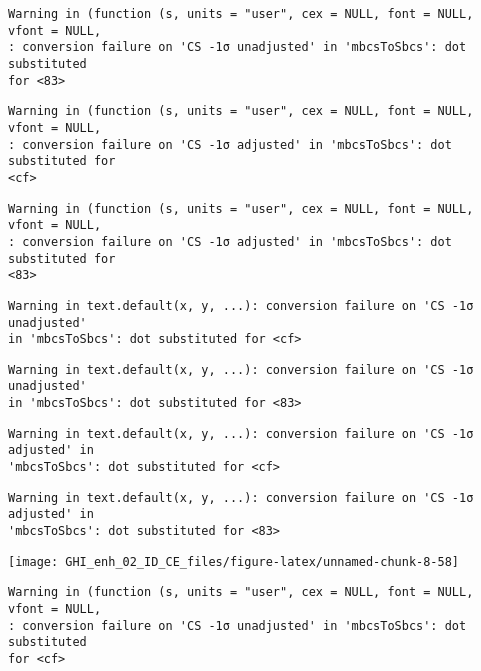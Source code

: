 \documentclass[
  10pt,
  a4paper,oneside]{article}
\begin{document}
\begin{verbatim}
Warning in (function (s, units = "user", cex = NULL, font = NULL, vfont = NULL,
: conversion failure on 'CS -1σ unadjusted' in 'mbcsToSbcs': dot substituted
for <83>
\end{verbatim}

\begin{verbatim}
Warning in (function (s, units = "user", cex = NULL, font = NULL, vfont = NULL,
: conversion failure on 'CS -1σ adjusted' in 'mbcsToSbcs': dot substituted for
<cf>
\end{verbatim}

\begin{verbatim}
Warning in (function (s, units = "user", cex = NULL, font = NULL, vfont = NULL,
: conversion failure on 'CS -1σ adjusted' in 'mbcsToSbcs': dot substituted for
<83>
\end{verbatim}

\begin{verbatim}
Warning in text.default(x, y, ...): conversion failure on 'CS -1σ unadjusted'
in 'mbcsToSbcs': dot substituted for <cf>
\end{verbatim}

\begin{verbatim}
Warning in text.default(x, y, ...): conversion failure on 'CS -1σ unadjusted'
in 'mbcsToSbcs': dot substituted for <83>
\end{verbatim}

\begin{verbatim}
Warning in text.default(x, y, ...): conversion failure on 'CS -1σ adjusted' in
'mbcsToSbcs': dot substituted for <cf>
\end{verbatim}

\begin{verbatim}
Warning in text.default(x, y, ...): conversion failure on 'CS -1σ adjusted' in
'mbcsToSbcs': dot substituted for <83>
\end{verbatim}

\begin{center}\texttt{[image: GHI\_enh\_02\_ID\_CE\_files/figure-latex/unnamed-chunk-8-58]} \end{center}

\begin{verbatim}
Warning in (function (s, units = "user", cex = NULL, font = NULL, vfont = NULL,
: conversion failure on 'CS -1σ unadjusted' in 'mbcsToSbcs': dot substituted
for <cf>
\end{verbatim}
\end{document}
